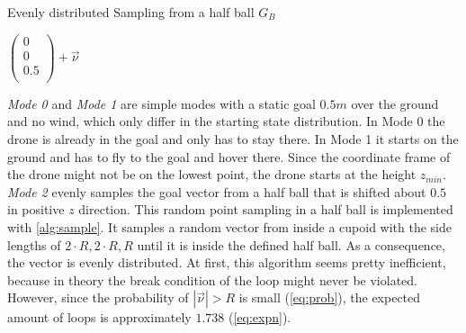 \newpage
\begin{algorithm}
	\caption{Evenly distributed Sampling from a half ball $G_{B}$}
	\label{alg:sample}
	
	
	\Return $ \left( \begin{array}{c}
		0 \\
		0 \\
		0.5\\
	\end{array}\right) + \overrightarrow{\nu}$
	
\end{algorithm}
\emph{Mode 0} and \emph{Mode 1} are simple modes with a static goal $0.5 m$ over the ground and no wind, which only differ in the starting state distribution. 
In Mode 0 the drone is already in the goal and only has to stay there. 
In Mode 1 it starts on the ground and has to fly to the goal and hover there. 
Since the coordinate frame of the drone might not be on the lowest point, the drone starts at the height $z_{min}$.\\
\emph{Mode 2} evenly samples the goal vector from a half ball that is shifted about $0.5$ in positive $z$ direction. 
This random point sampling in a half ball is implemented with \cref{alg:sample}. 
It samples a random vector from inside a cupoid with the side lengths of $2 \cdot R, 2 \cdot R, R$ 
until it is inside the defined half ball. As a consequence, the vector is evenly distributed. 
At first, this algorithm seems pretty inefficient, because in theory the break condition of the loop might never be violated. 
However, since the probability of $|\overrightarrow{\nu}| > R$ is small (\cref{eq:prob}),
the expected amount of loops is approximately $1.738$ (\cref{eq:expn}).
